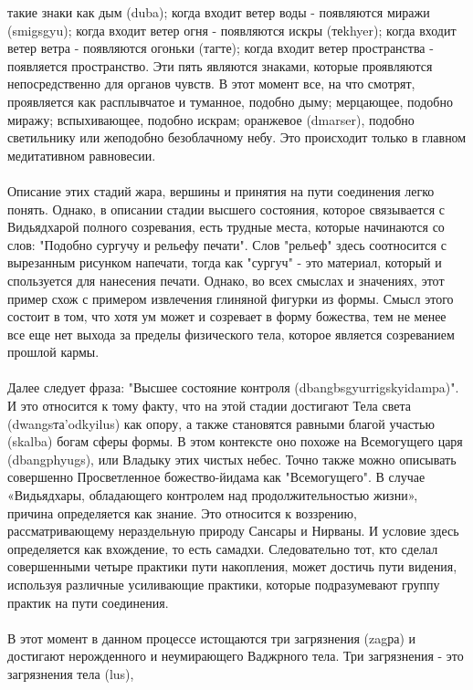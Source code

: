 такие знаки как дым (duba); когда входит ветер воды - появляются миражи (smigsgyu); когда
входит ветер огня - появляются искры (теkhyer); когда входит ветер ветра - появляются 
огоньки (тагте); когда входит ветер пространства - появляется пространство. Эти пять 
являются знаками, которые проявляются непосредственно для органов чувств. В этот момент 
все, на что смотрят, проявляется как расплывчатое и туманное, подобно дыму; мерцающее,
подобно миражу; вспыхивающее, подобно искрам; оранжевое (dmarser), подобно 
светильнику или жеподобно безоблачному небу. Это происходит только в главном
медитативном равновесии.\\
\\
Описание этих стадий жара, вершины и принятия на пути соединения легко понять. Однако, 
в описании стадии высшего состояния, которое связывается с Видьядхарой полного
созревания, есть трудные места, которые начинаются со слов: "Подобно сургучу и рельефу 
печати". Слов "рельеф" здесь соотносится с вырезанным рисунком напечати, тогда как 
"сургуч" - это материал, который и спользуется для нанесения печати. Однако, во всех 
смыслах и значениях, этот пример схож с примером извлечения глиняной фигурки из 
формы. Смысл этого состоит в том, что хотя ум может и созревает в форму божества, тем не
менее все еще нет выхода за пределы физического тела, которое является созреванием
прошлой кармы.\\
\\
Далее следует фраза: "Высшее состояние контроля (dbangbsgyurrigskyidampa)". И это 
относится к тому факту, что на этой стадии достигают Тела света (dwangsта'odkyilus) как 
опору, а также становятся равными благой участью (skalba) богам сферы формы. В этом 
контексте оно похоже на Всемогущего царя (dbangphyugs), или Владыку этих чистых небес. 
Точно также можно описывать совершенно Просветленное божество-йидама как "Всемогущего".
В случае «Видьядхары, обладающего контролем над продолжительностью жизни», причина
определяется как знание. Это относится к воззрению, рассматривающему нераздельную 
природу Сансары и Нирваны. И условие здесь определяется как вхождение, то есть самадхи. 
Следовательно тот, кто сделал совершенными четыре практики пути накопления, может
достичь пути видения, используя различные усиливающие практики, которые 
подразумевают группу практик на пути соединения. \\
\\
В этот момент в данном процессе истощаются три загрязнения (zagра) и достигают 
нерожденного и неумирающего Ваджрного тела. Три загрязнения - это загрязнения тела (lus), 

